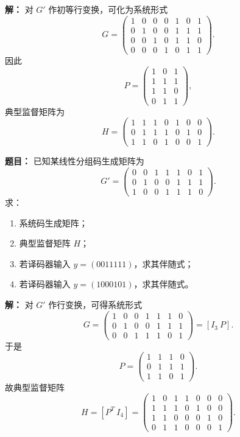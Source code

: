 \par\textbf{解：}
对 $G'$ 作初等行变换，可化为系统形式
\[
G=
\begin{pmatrix}
1&0&0&0&1&0&1\\
0&1&0&0&1&1&1\\
0&0&1&0&1&1&0\\
0&0&0&1&0&1&1
\end{pmatrix}.
\]
因此
\[
P=
\begin{pmatrix}
1&0&1\\
1&1&1\\
1&1&0\\
0&1&1
\end{pmatrix},
\]
典型监督矩阵为
\[
H=
\begin{pmatrix}
1&1&1&0&1&0&0\\
0&1&1&1&0&1&0\\
1&1&0&1&0&0&1
\end{pmatrix}.
\]

\medskip
{}
\textbf{题目：}
已知某线性分组码生成矩阵为
\[
G'=
\begin{pmatrix}
0&0&1&1&1&0&1\\
0&1&0&0&1&1&1\\
1&0&0&1&1&1&0
\end{pmatrix}.
\]
求：
\begin{enumerate}
\item 系统码生成矩阵；
\item 典型监督矩阵 $H$；
\item 若译码器输入 $y=(0011111)$，求其伴随式；
\item 若译码器输入 $y=(1000101)$，求其伴随式。
\end{enumerate}

\par\textbf{解：}
对 $G'$ 作行变换，可得系统形式
\[
G=
\begin{pmatrix}
1&0&0&1&1&1&0\\
0&1&0&0&1&1&1\\
0&0&1&1&1&0&1
\end{pmatrix}
=[I_3\ P].
\]
于是
\[
P=
\begin{pmatrix}
1&1&1&0\\
0&1&1&1\\
1&1&0&1
\end{pmatrix}.
\]
故典型监督矩阵
\[
H=[P^T\ I_4]
=
\begin{pmatrix}
1&0&1&1&0&0&0\\
1&1&1&0&1&0&0\\
1&1&0&0&0&1&0\\
0&1&1&0&0&0&1
\end{pmatrix}.
\]

